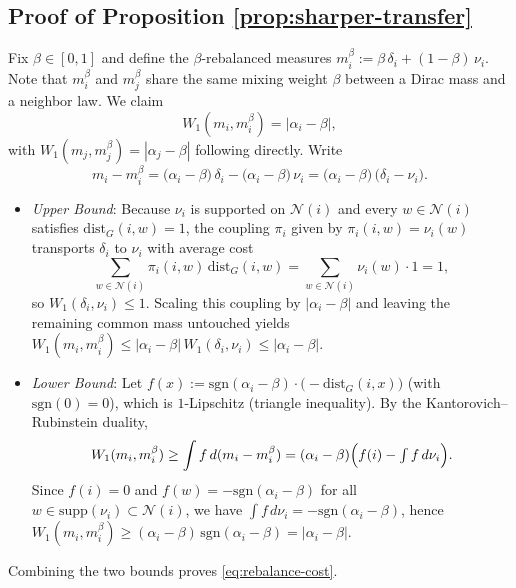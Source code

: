 \documentclass[twoside,11pt]{article}
\numberwithin{equation}{section}
\numberwithin{theorem}{section}
\numberwithin{example}{section}
\begin{document}
\subsection{Proof of Proposition \ref{prop:sharper-transfer}}
Fix $\beta\in[0,1]$ and define the $\beta$-rebalanced measures
\(
m_i^\beta := \beta\,\delta_i + (1-\beta)\,\nu_i.
\) 
Note that $m_i^\beta$ and $m_j^\beta$ share the same mixing weight $\beta$ between a Dirac mass and a neighbor law.
We claim
\begin{equation}
\label{eq:rebalance-cost}
W_1(m_i,m_i^\beta) = |\alpha_i-\beta|,
\end{equation}
with $W_1(m_j,m_j^\beta) = |\alpha_j-\beta|$ following directly.
Write
\[
m_i - m_i^\beta
= \bigl(\alpha_i-\beta\bigr)\,\delta_i - \bigl(\alpha_i-\beta\bigr)\,\nu_i
= \bigl(\alpha_i-\beta\bigr)\,\bigl(\delta_i - \nu_i\bigr).
\]
\begin{itemize}
\item[(i)] \emph{Upper Bound}: Because $\nu_i$ is supported on $\mathcal N(i)$ and every $w\in \mathcal N(i)$ satisfies $\mathrm{dist}_G(i,w)=1$, the coupling $\pi_i$ given by $\pi_i(i,w)=\nu_i(w)$ transports $\delta_i$ to $\nu_i$ with average cost
\[
\sum_{w\in\mathcal N(i)} \pi_i(i,w)\,\mathrm{dist}_G(i,w)
= \sum_{w\in\mathcal N(i)} \nu_i(w)\cdot 1 = 1,
\]
so $W_1(\delta_i,\nu_i)\le 1$. Scaling this coupling by $|\alpha_i-\beta|$ and leaving the remaining common mass untouched yields 
\(
W_1(m_i,m_i^\beta) \le |\alpha_i-\beta|\,W_1(\delta_i,\nu_i)\le |\alpha_i-\beta|.
\)
\item[(ii)] \emph{Lower Bound}:
Let $f(x):=\mathrm{sgn}(\alpha_i-\beta)\cdot\bigl(-\mathrm{dist}_G(i,x)\bigr)$ (with $\mathrm{sgn}(0)=0$), which is $1$-Lipschitz (triangle inequality). By the Kantorovich--Rubinstein duality,
\[
W_1(m_i,m_i^\beta)
\ge
\int f\,d(m_i-m_i^\beta)
= (\alpha_i-\beta)\Bigl( f(i) - \textstyle\int f\,d\nu_i \Bigr).
\]
Since $f(i)=0$ and $f(w)=-\mathrm{sgn}(\alpha_i-\beta)$ for all $w\in\mathrm{supp}(\nu_i)\subset\mathcal N(i)$, we have $\int f\,d\nu_i = -\mathrm{sgn}(\alpha_i-\beta)$, hence
\(
W_1(m_i,m_i^\beta) \ge (\alpha_i-\beta)\,\mathrm{sgn}(\alpha_i-\beta)=|\alpha_i-\beta|.
\)
\end{itemize}
Combining the two bounds proves \eqref{eq:rebalance-cost}.
\end{document}
